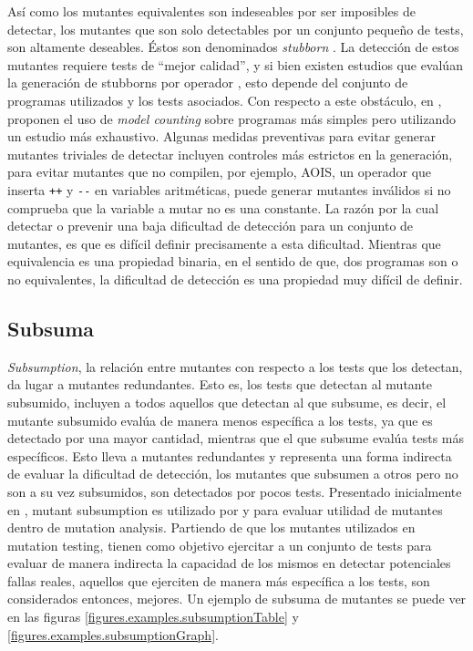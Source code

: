 As\'i como los mutantes equivalentes son indeseables por ser imposibles de detectar, los mutantes que son solo detectables por un conjunto peque\~no de tests, son altamente deseables. \'Estos son denominados \emph{stubborn} \cite{bibliography.mutation.evaluation.stubbornHieronsHD99}. La detecci\'on de estos mutantes requiere tests de ``mejor calidad'', y si bien existen estudios que eval\'uan la generaci\'on de stubborns por operador \cite{bibliography.mutation.evaluation.stubborn}, esto depende del conjunto de programas utilizados y los tests asociados. Con respecto a este obst\'aculo, en \cite{bibliography.mutation.evaluation.hardnessVisser}, proponen el uso de \emph{model counting} sobre programas m\'as simples pero utilizando un estudio m\'as exhaustivo. Algunas medidas preventivas para evitar generar mutantes triviales de detectar incluyen controles m\'as estrictos en la generaci\'on, para evitar mutantes que no compilen, por ejemplo, AOIS, un operador que inserta \lstinline|++| y \lstinline|--| en variables aritm\'eticas, puede generar mutantes inv\'alidos si no comprueba que la variable a mutar no es una constante. La raz\'on por la cual detectar o prevenir una baja dificultad de detecci\'on para un conjunto de mutantes, es que es dif\'icil definir precisamente a esta dificultad. Mientras que equivalencia es una propiedad binaria, en el sentido de que, dos programas son o no equivalentes, la dificultad de detecci\'on es una propiedad muy dif\'icil de definir. 

\subsection{Subsuma}

\emph{Subsumption}, la relaci\'on entre mutantes con respecto a los tests que los detectan, da lugar a mutantes redundantes. Esto es, los tests que detectan al mutante subsumido, incluyen a todos aquellos que detectan al que subsume, es decir, el mutante subsumido eval\'ua de manera menos espec\'ifica a los tests, ya que es detectado por una mayor cantidad, mientras que el que subsume eval\'ua tests m\'as espec\'ificos. Esto lleva a mutantes redundantes y representa una forma indirecta de evaluar la dificultad de detecci\'on, los mutantes que subsumen a otros pero no son a su vez subsumidos, son detectados por pocos tests. Presentado inicialmente en \cite{bibliography.mutation.selection.Offutt96}, mutant subsumption es utilizado por \cite{bibliography.mutation.minimizing.dynamicsubsumption} y \cite{bibliography.mutation.evaluation.JustKA17} para evaluar utilidad de mutantes dentro de mutation analysis. Partiendo de que los mutantes utilizados en mutation testing, tienen como objetivo ejercitar a un conjunto de tests para evaluar de manera indirecta la capacidad de los mismos en detectar potenciales fallas reales, aquellos que ejerciten de manera m\'as espec\'ifica a los tests, son considerados entonces, mejores. Un ejemplo de subsuma de mutantes se puede ver en las figuras \ref{figures.examples.subsumptionTable} y \ref{figures.examples.subsumptionGraph}.

